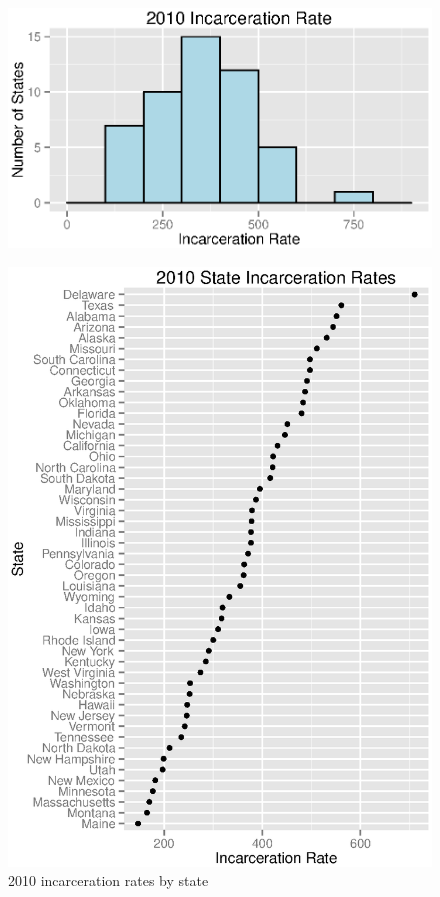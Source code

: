 \documentclass{exam}
\begin{document}
  \begin{figure}[H]
    \centering
    \includegraphics[scale = 0.9]{2010_rate_histogram.eps}
  \end{figure}

  \begin{figure}[H]
    \centering
    \includegraphics[scale = 0.9]{rate_by_state_2010.eps}
    \caption{2010 incarceration rates by state}
  \end{figure}
\end{document}
